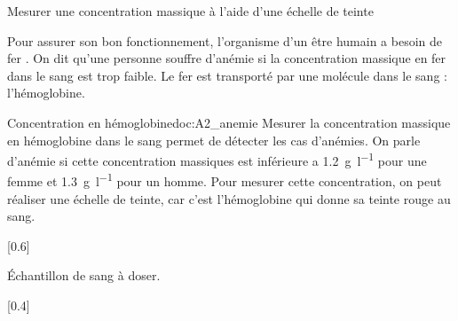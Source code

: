 \teteSndSolu

\vspace*{-36pt}

\begin{objectifs}
  \item Mesurer une concentration massique à l'aide d'une échelle de teinte
\end{objectifs}


\begin{contexte}
  Pour assurer son bon fonctionnement, l'organisme d'un être humain a besoin de fer .
  On dit qu'une personne souffre d'anémie si la concentration massique en fer dans le sang est trop faible.
  Le fer est transporté par une molécule dans le sang : l'hémoglobine.

\end{contexte}


\begin{doc}{Concentration en hémoglobine}{doc:A2_anemie}
  Mesurer la concentration massique en hémoglobine dans le sang permet de détecter les cas d'anémies.
  On parle d'anémie si cette concentration massiques est inférieure a
  \qty{1,2}{\g\per\litre} pour une femme et \qty{1,3}{\g\per\litre} pour un homme.
  Pour mesurer cette concentration, on peut réaliser une échelle de teinte, car c'est l'hémoglobine qui donne sa teinte rouge au sang.

  [0.6]{
    \begin{center}
  
      Échantillon de sang à doser.
    \end{center}
  }[0.4]
\end{doc}

